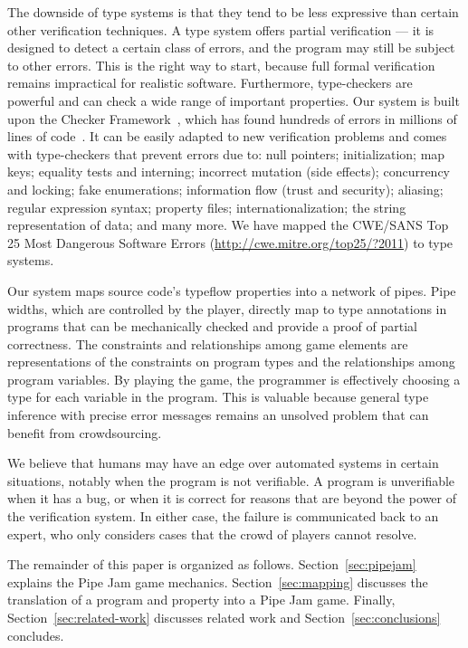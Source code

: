 \documentclass{sig-alternate}
\newcommand{\secref}[1]{Section~\ref{#1}}
\begin{document}
The downside of type systems is that they tend to be less expressive than
certain other verification techniques.
A type system offers partial verification --- it is designed to detect
a certain class of errors, and the program may still be subject to
other errors.  This is the right way to start, because full formal
verification remains impractical for realistic software.  Furthermore,
type-checkers are powerful and can check a wide range of important
properties.  Our system is built upon the Checker
Framework~\cite{checker-framework-website},
which has found hundreds of errors in millions of lines of
code~\cite{PapiACPE2008,DietlDEMS2011}.  It can be easily adapted to new
verification problems and comes
with type-checkers that prevent errors due to:  null pointers;
initialization; map keys; equality tests and interning; incorrect
mutation (side effects); concurrency and locking; fake enumerations;
information flow (trust and security); aliasing; regular expression
syntax; property files; internationalization; the string
representation of data; and many more.  We have mapped the CWE/SANS Top 25
Most Dangerous Software Errors (\url{http://cwe.mitre.org/top25/?2011})
to type systems.

Our system maps source code's typeflow properties
into a network of pipes.
Pipe widths, which are controlled by the player, directly map to type
annotations in programs that can be mechanically checked and provide a
proof of partial correctness.
The constraints and relationships among
game elements are representations of the constraints on program types and
the relationships among program variables.
By playing the game, the programmer is effectively choosing a type for
each variable in the program.
This is valuable because general type inference with precise error messages
remains an unsolved problem that can benefit from crowdsourcing.

We believe that humans may have an edge over automated systems in
certain situations, notably when the program is not verifiable.  A
program is unverifiable when it has a bug, or when it is correct for
reasons that are beyond the power of the verification system.  In
either case, the failure is communicated back to an expert, who only
considers cases that the crowd of players cannot resolve.


\medskip

The remainder of this paper is organized as follows.
\secref{sec:pipejam} explains the Pipe Jam game mechanics.
\secref{sec:mapping} discusses the translation of a program and
property into a Pipe Jam game.
Finally, \secref{sec:related-work} discusses related
work and \secref{sec:conclusions} concludes.
\end{document}
